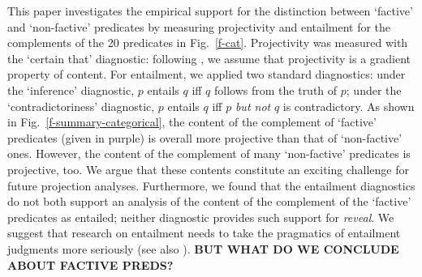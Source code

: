 \documentclass[12pt,fleqn]{article}
\newcommand{\6}{\mbox{$[\hspace*{-.6mm}[$}}
\newcommand{\9}{\mbox{$]\hspace*{-.6mm}]$}}
\begin{document}
This paper investigates the empirical support for the distinction between `factive' and `non-factive' predicates by measuring projectivity and entailment for the complements of the 20 predicates in Fig.\ \ref{f-cat}. Projectivity was measured with the `certain that' diagnostic: following \citealt*{tbd-variability}, we assume that projectivity is a gradient property of content. For entailment, we applied two standard diagnostics: under the `inference' diagnostic, $p$ entails $q$ iff $q$ follows from the truth of $p$; under the `contradictoriness' diagnostic, $p$ entails $q$ iff $p$ {\em but not} $q$ is contradictory. As shown in Fig.\ \ref{f-summary-categorical}, the content of the complement of `factive' predicates (given in purple) is overall more projective than that of `non-factive' ones. However, the content of the complement of many `non-factive' predicates is projective, too. We argue that these contents constitute an exciting challenge for future projection analyses. Furthermore, we found that the entailment diagnostics do not both support an analysis of the content of the complement of the `factive' predicates as entailed; neither diagnostic provides such support for {\em reveal}. We suggest that research on entailment needs to take the pragmatics of entailment judgments more seriously (see also \citealt{demarneffe-etal2012}). {\bf BUT WHAT DO WE CONCLUDE ABOUT FACTIVE PREDS?} 
\end{document}
